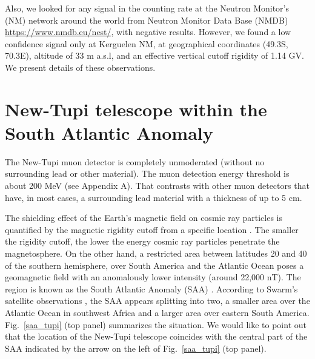\documentclass[twocolumn]{aastex63}
\begin{document}
Also, we looked for any signal in the counting rate at the Neutron Monitor's (NM) network around the world from  Neutron Monitor Data Base (NMDB)
\url{https://www.nmdb.eu/nest/}, with negative results. However, we found a low confidence signal only at Kerguelen NM, at geographical coordinates (49.3S, 70.3E), altitude of 33 m a.s.l, and an effective vertical cutoff rigidity of 1.14 GV.
We present details of these observations. 


\section{New-Tupi telescope within the South Atlantic Anomaly}

The New-Tupi muon detector is completely
unmoderated (without no surrounding lead or other material). The muon detection energy threshold is about 200 MeV (see Appendix A). That contrasts with other muon detectors that have, in most cases, a surrounding lead material with a  thickness of up to 5 cm.

The shielding effect of the Earth's magnetic field on cosmic ray particles is quantified by the magnetic rigidity cutoff from a specific location \citep{smar09}. The smaller the rigidity cutoff, the lower the energy cosmic ray particles penetrate the magnetosphere.
On the other hand, a restricted area between latitudes 20 and 40 of the southern hemisphere, over South America
and the Atlantic Ocean poses a geomagnetic field
with an anomalously lower intensity (around 22,000
nT). The region is known as the South Atlantic Anomaly
(SAA) \citep{pavo16}. According to Swarm's satellite observations
\citep{finl20}, the SAA appears splitting into two, a smaller area
over the Atlantic Ocean in southwest Africa and a larger
area over eastern South America. Fig.~\ref{saa_tupi} (top panel) summarizes
the situation. We would like to point out that
the location of the New-Tupi telescope coincides with the central
part of the SAA indicated by the arrow on the left
of Fig.~\ref{saa_tupi} (top panel).
\end{document}
